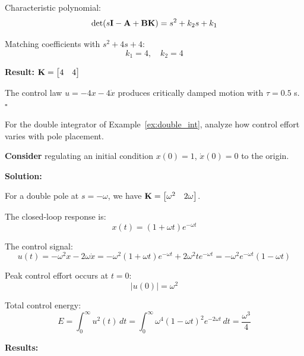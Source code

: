 \begin{example}
Characteristic polynomial:
\begin{equation}
\det(s\mathbf{I} - \mathbf{A} + \mathbf{B}\mathbf{K}) = s^2 + k_2 s + k_1
\end{equation}

Matching coefficients with $s^2 + 4s + 4$:
\begin{equation}
k_1 = 4, \quad k_2 = 4
\end{equation}

\textbf{Result:} $\mathbf{K} = \begin{bmatrix} 4 & 4 \end{bmatrix}$

The control law $u = -4x - 4\dot{x}$ produces critically damped motion with $\tau = 0.5$ s. \hfill $\square$
\end{example}

\begin{example}
\label{ex:control_effort}
For the double integrator of Example~\ref{ex:double_int}, analyze how control effort varies with pole placement.

\textbf{Consider} regulating an initial condition $x(0) = 1$, $\dot{x}(0) = 0$ to the origin.

\textbf{Solution:}

For a double pole at $s = -\omega$, we have $\mathbf{K} = \begin{bmatrix} \omega^2 & 2\omega \end{bmatrix}$.

The closed-loop response is:
\begin{equation}
x(t) = (1 + \omega t)e^{-\omega t}
\end{equation}

The control signal:
\begin{equation}
u(t) = -\omega^2 x - 2\omega\dot{x} = -\omega^2(1 + \omega t)e^{-\omega t} + 2\omega^2 t e^{-\omega t} = -\omega^2 e^{-\omega t}(1 - \omega t)
\end{equation}

Peak control effort occurs at $t = 0$:
\begin{equation}
|u(0)| = \omega^2
\end{equation}

Total control energy:
\begin{equation}
E = \int_0^\infty u^2(t)\,dt = \int_0^\infty \omega^4(1 - \omega t)^2 e^{-2\omega t}\,dt = \frac{\omega^3}{4}
\end{equation}

\textbf{Results:}


\end{example}

